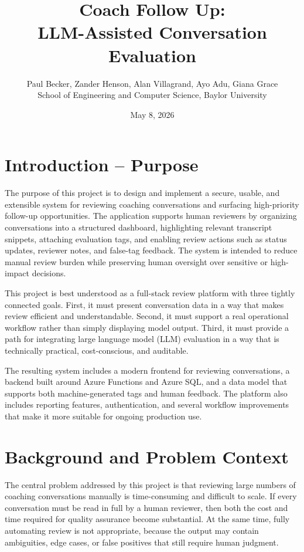 \documentclass[12pt]{article}
\title{Coach Follow Up: \\ LLM-Assisted Conversation Evaluation}
\author{{Paul Becker, Zander Henson, Alan Villagrand, Ayo Adu, Giana Grace} \\
	School of Engineering and Computer Science, Baylor University}
\date{{May 8, 2026}}
\begin{document}
	
	\maketitle
	
	\section{Introduction -- Purpose}
	
	The purpose of this project is to design and implement a secure, usable, and extensible system for reviewing coaching conversations and surfacing high-priority follow-up opportunities. The application supports human reviewers by organizing conversations into a structured dashboard, highlighting relevant transcript snippets, attaching evaluation tags, and enabling review actions such as status updates, reviewer notes, and false-tag feedback. The system is intended to reduce manual review burden while preserving human oversight over sensitive or high-impact decisions.
	
	This project is best understood as a full-stack review platform with three tightly connected goals. First, it must present conversation data in a way that makes review efficient and understandable. Second, it must support a real operational workflow rather than simply displaying model output. Third, it must provide a path for integrating large language model (LLM) evaluation in a way that is technically practical, cost-conscious, and auditable.
	
	The resulting system includes a modern frontend for reviewing conversations, a backend built around Azure Functions and Azure SQL, and a data model that supports both machine-generated tags and human feedback. The platform also includes reporting features, authentication, and several workflow improvements that make it more suitable for ongoing production use.
	
	\section{Background and Problem Context}
	
	The central problem addressed by this project is that reviewing large numbers of coaching conversations manually is time-consuming and difficult to scale. If every conversation must be read in full by a human reviewer, then both the cost and time required for quality assurance become substantial. At the same time, fully automating review is not appropriate, because the output may contain ambiguities, edge cases, or false positives that still require human judgment.
	
\end{document}
